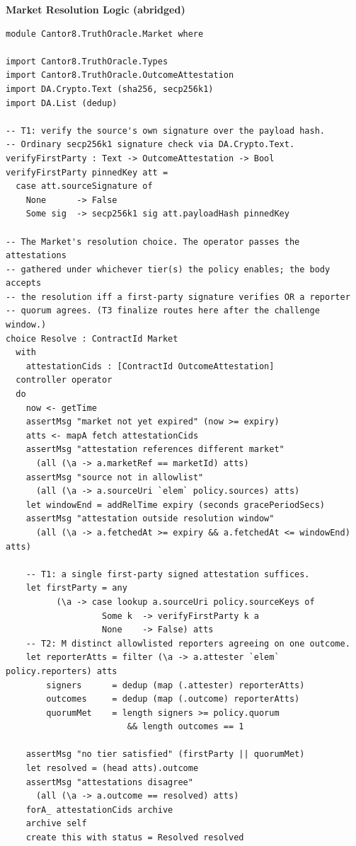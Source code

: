 \documentclass[11pt,a4paper]{article}
\begin{document}
\begin{center}
\textbf{Market Resolution Logic (abridged)}
\end{center}
\begin{lstlisting}
module Cantor8.TruthOracle.Market where

import Cantor8.TruthOracle.Types
import Cantor8.TruthOracle.OutcomeAttestation
import DA.Crypto.Text (sha256, secp256k1)
import DA.List (dedup)

-- T1: verify the source's own signature over the payload hash.
-- Ordinary secp256k1 signature check via DA.Crypto.Text.
verifyFirstParty : Text -> OutcomeAttestation -> Bool
verifyFirstParty pinnedKey att =
  case att.sourceSignature of
    None      -> False
    Some sig  -> secp256k1 sig att.payloadHash pinnedKey

-- The Market's resolution choice. The operator passes the attestations
-- gathered under whichever tier(s) the policy enables; the body accepts
-- the resolution iff a first-party signature verifies OR a reporter
-- quorum agrees. (T3 finalize routes here after the challenge window.)
choice Resolve : ContractId Market
  with
    attestationCids : [ContractId OutcomeAttestation]
  controller operator
  do
    now <- getTime
    assertMsg "market not yet expired" (now >= expiry)
    atts <- mapA fetch attestationCids
    assertMsg "attestation references different market"
      (all (\a -> a.marketRef == marketId) atts)
    assertMsg "source not in allowlist"
      (all (\a -> a.sourceUri `elem` policy.sources) atts)
    let windowEnd = addRelTime expiry (seconds gracePeriodSecs)
    assertMsg "attestation outside resolution window"
      (all (\a -> a.fetchedAt >= expiry && a.fetchedAt <= windowEnd) atts)

    -- T1: a single first-party signed attestation suffices.
    let firstParty = any
          (\a -> case lookup a.sourceUri policy.sourceKeys of
                   Some k  -> verifyFirstParty k a
                   None    -> False) atts
    -- T2: M distinct allowlisted reporters agreeing on one outcome.
    let reporterAtts = filter (\a -> a.attester `elem` policy.reporters) atts
        signers      = dedup (map (.attester) reporterAtts)
        outcomes     = dedup (map (.outcome) reporterAtts)
        quorumMet    = length signers >= policy.quorum
                        && length outcomes == 1

    assertMsg "no tier satisfied" (firstParty || quorumMet)
    let resolved = (head atts).outcome
    assertMsg "attestations disagree"
      (all (\a -> a.outcome == resolved) atts)
    forA_ attestationCids archive
    archive self
    create this with status = Resolved resolved
\end{lstlisting}
\end{document}
